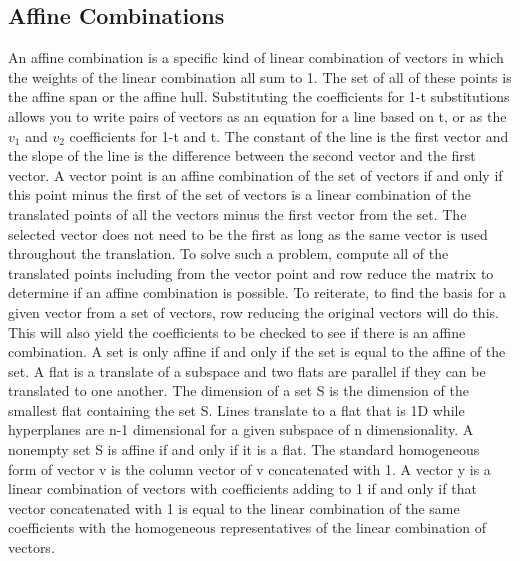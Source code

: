 \documentclass[12pt]{article}
\begin{document}
\subsection{Affine Combinations}
An affine combination is a specific kind of linear combination of vectors in which the weights of the linear combination all sum to 1. The set of all of these points is the affine span 
or the affine hull. Substituting the coefficients for 1-t substitutions allows you to write pairs of vectors as an equation for a line based on t, or as the $v_1$ and $v_2$ coefficients 
for 1-t and t. The constant of the line is the first vector and the slope of the line is the difference between the second vector and the first vector. A vector point is an affine 
combination of the set of vectors if and only if this point minus the first of the set of vectors is a linear combination of the translated points of all the vectors minus the first vector 
from the set. The selected vector does not need to be the first as long as the same vector is used throughout the translation. To solve such a problem, compute all of the translated 
points including from the vector point and row reduce the matrix to determine if an affine combination is possible. 
\newline
\newline
To reiterate, to find the basis for a given vector from a set of vectors, row reducing the original vectors will do this. This will also yield the coefficients to be checked to see if there 
is an affine combination. A set is only affine if and only if the set is equal to the affine of the set. A flat is a translate of a subspace and two flats are parallel if they can be translated 
to one another. The dimension of a set S is the dimension of the smallest flat containing the set S. Lines translate to a flat that is 1D while hyperplanes are n-1 dimensional for a 
given subspace of n dimensionality. A nonempty set S is affine if and only if it is a flat. 
\newline
\newline
The standard homogeneous form of vector v is the column vector of v concatenated with 1. A vector y is a linear combination of vectors with coefficients adding to 1 if and only if that 
vector concatenated with 1 is equal to the linear combination of the same coefficients with the homogeneous representatives of the linear combination of vectors. 
\end{document}
